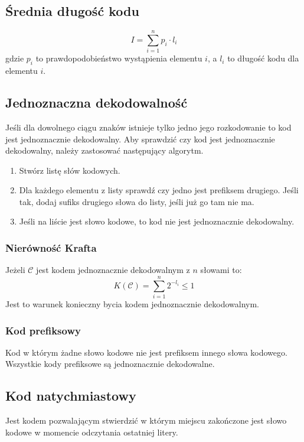 \documentclass{../notatki}
\begin{document}
\subsection{Średnia długość kodu}

$$
I = \sum_{i=1}^{n}p_i \cdot l_i
$$
gdzie $p_i$ to prawdopodobieństwo wystąpienia elementu $i$, a $l_i$ to długość
kodu dla elementu $i$.

\subsection{Jednoznaczna dekodowalność}

Jeśli dla dowolnego ciągu znaków istnieje tylko jedno jego rozkodowanie to
kod jest jednoznacznie dekodowalny. Aby sprawdzić czy kod jest jednoznacznie
dekodowalny, należy zastosować następujący algorytm.

\begin{enumerate}
  \item Stwórz listę słów kodowych.
  \item Dla każdego elementu z listy sprawdź czy jedno jest prefiksem
    drugiego. Jeśli tak, dodaj sufiks drugiego słowa do listy, jeśli
    już go tam nie ma.
  \item Jeśli na liście jest słowo kodowe, to kod nie jest jednoznacznie
    dekodowalny.
\end{enumerate}

\subsubsection{Nierówność Krafta}

Jeżeli $\mathcal{C}$ jest kodem jednoznacznie dekodowalnym z $n$ słowami to:
$$
K(\mathcal{C}) = \sum_{i=1}^{n}2^{-l_i} \leq 1
$$
Jest to warunek konieczny bycia kodem jednoznacznie dekodowalnym.

\subsubsection{Kod prefiksowy}

Kod w którym żadne słowo kodowe nie jest prefiksem innego słowa
kodowego. Wszystkie kody prefiksowe są jednoznacznie dekodowalne.

\subsection{Kod natychmiastowy}

Jest kodem pozwalającym stwierdzić w którym miejscu zakończone jest
słowo kodowe w momencie odczytania ostatniej litery.
\end{document}
